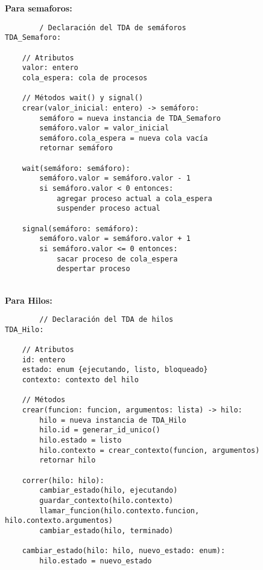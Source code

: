\documentclass[12pt]{article}
\begin{document}
\begin{enumerate}
    \textbf{Para semaforos:}\\
    \begin{verbatim}
        / Declaración del TDA de semáforos
TDA_Semaforo:

    // Atributos
    valor: entero
    cola_espera: cola de procesos

    // Métodos wait() y signal()
    crear(valor_inicial: entero) -> semáforo:
        semáforo = nueva instancia de TDA_Semaforo
        semáforo.valor = valor_inicial
        semáforo.cola_espera = nueva cola vacía
        retornar semáforo

    wait(semáforo: semáforo):
        semáforo.valor = semáforo.valor - 1
        si semáforo.valor < 0 entonces:
            agregar proceso actual a cola_espera
            suspender proceso actual

    signal(semáforo: semáforo):
        semáforo.valor = semáforo.valor + 1
        si semáforo.valor <= 0 entonces:
            sacar proceso de cola_espera
            despertar proceso
    \end{verbatim}\\

    \textbf{Para Hilos:}\\
    \begin{verbatim}
        // Declaración del TDA de hilos
TDA_Hilo:

    // Atributos
    id: entero
    estado: enum {ejecutando, listo, bloqueado}
    contexto: contexto del hilo

    // Métodos
    crear(funcion: funcion, argumentos: lista) -> hilo:
        hilo = nueva instancia de TDA_Hilo
        hilo.id = generar_id_unico()
        hilo.estado = listo
        hilo.contexto = crear_contexto(funcion, argumentos)
        retornar hilo

    correr(hilo: hilo):
        cambiar_estado(hilo, ejecutando)
        guardar_contexto(hilo.contexto)
        llamar_funcion(hilo.contexto.funcion, hilo.contexto.argumentos)
        cambiar_estado(hilo, terminado)

    cambiar_estado(hilo: hilo, nuevo_estado: enum):
        hilo.estado = nuevo_estado
    \end{verbatim}
\end{enumerate}
\end{document}
